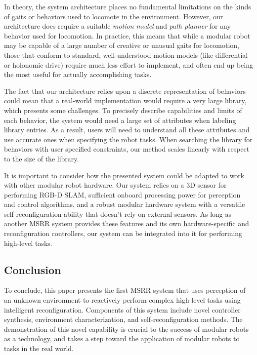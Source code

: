 \documentclass[journal]{IEEEtran}
\begin{document}
In theory, the system architecture places no fundamental limitations on the kinds of gaits or behaviors used to locomote in the environment.  However, our architecture does require a suitable \textit{motion model} and \textit{path planner} for any behavior used for locomotion.  In practice, this means that while a modular robot may be capable of a large number of creative or unusual gaits for locomotion, those that conform to standard, well-understood motion models (like differential or holonomic drive) require much less effort to implement, and often end up being the most useful for actually accomplishing tasks.

The fact that our architecture relies upon a discrete representation of behaviors could mean that a real-world implementation would require a very large library, which presents some challenges. To precisely describe capabilities and limits of each behavior, the system would need a large set of attributes when labeling library entries. As a result, users will need to understand all these attributes and use accurate ones when specifying the robot tasks. 
When searching the library for behaviors with user specified constraints, our method scales linearly with respect to the size of the library.%

It is important to consider how the presented system could be adapted to work with
other modular robot hardware. Our system relies on a 3D sensor for performing RGB-D
SLAM, sufficient onboard processing power for perception and control algorithms,
and a robust modular hardware system with a versatile self-reconfiguration ability
that doesn't rely on external sensors. As long as another MSRR system provides these
features and its own hardware-specific and reconfiguration controllers, our system
can be integrated into it for performing high-level tasks.
%
\subsection{Conclusion}
%
To conclude, this paper presents the first MSRR system that uses perception of an unknown environment to reactively perform complex high-level tasks using intelligent reconfiguration. Components of this system include novel controller synthesis, environment characterization, and self-reconfiguration methods. The demonstration of this novel capability is crucial to the success of modular robots as a technology, and takes a step toward the application of modular robots to tasks in the real world.
%
%
\end{document}
